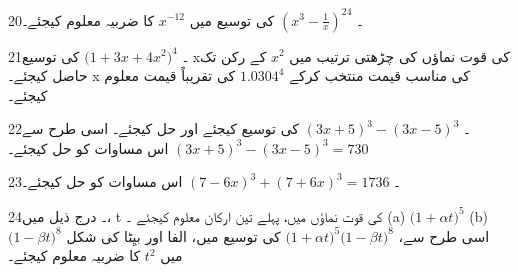 20۔
\(({x}^{3}-\frac{1}{x})^{24}\)
کی توسیع میں 
\( {x}^{-12}\)  
کا ضربیہ معلوم کیجئے۔

21۔
\( {(1+3{x}+4{x}^{2}})^{4}\)
کی توسیع xکی قوت نماؤں کی چڑھتی ترتیب میں
\({x}^{2}\)
کے رکن تک حاصل کیجئے۔  x  کی مناسب قیمت منتخب کرکے
 \(1.0304^{4}\) 
کی تقریباً قیمت معلوم کیجئے۔

22۔
   \( {(3x+5)}^{3}-{(3x-5)}^{3}\)
کی توسیع کیجئے اور حل کیجئے۔  اسی طرح سے
   \({(3x+5)}^{3}-{(3x-5)}^{3}=730\)
اس مساوات کو حل کیجئے۔

23۔
\( {(7-6x)}^{3}+{(7+6x)}^{3}=1736\)
اس مساوات کو حل کیجئے۔

24۔ درج ذیل میں، t  کی قوت نماؤں میں،  پہلے تین ارکان معلوم کیجئے ۔ 
	(a)	 \({(1+\alpha{t}})^{5} \)
	(b) \({(1-\beta{t}})^{8}\)
اسی طرح سے،
\( {(1+\alpha{t}})^{5}{(1-\beta{t}})^{8}\)
کی توسیع میں،   الفا   اور    بیِٹا   کی شکل میں
\(t^{2}\)
کا ضربیہ معلوم کیجئے۔ 

